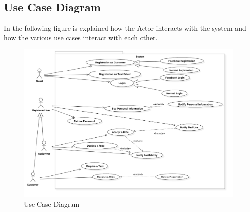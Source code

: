 \subsection{Use Case Diagram}
	In the following figure is explained how the Actor interacts with the system and how the various use cases interact with each other.

				\begin{figure}[H]
					\centering
					\includegraphics[width=\textwidth, scale=0.5]{IMG/UseCaseDiagram.png}
					\caption{Use Case Diagram}\label{sec:UseCaseDiagramFigure}
				\end{figure}
				
				

				